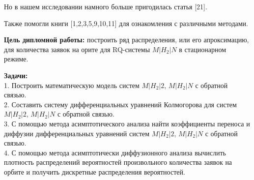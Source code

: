 Но в нашем исследовании намного больше пригодилась статья [21].

Также помогли книги [1,2,3,5,9,10,11] для ознакомления с различными методами.

\textbf{Цель дипломной работы:} построить ряд распределения, или его апроксимацию, для количества заявок на орите для RQ-системы $M|H_2|N$ в стационарном режиме.

\textbf{Задачи:}\\
1. Построить математическую модель систем $M|H_{2}|2$, $M|H_{2}|N$ с обратной связью.\\
2. Составить систему дифференциальных уравнений Колмогорова для систем $M|H_{2}|2$, $M|H_{2}|N$ с обратной связью.\\
3. С помощью метода асимптотического анализа найти коэффициенты переноса и диффузии дифференциальных уравнений систем $M|H_{2}|2$, $M|H_{2}|N$ с обратной связью.\\
4. С помощью метода асимптотически диффузионного анализа вычислить плотность распределений вероятностей произвольного количества заявок на орбите и получить дискретные распределения вероятностей.